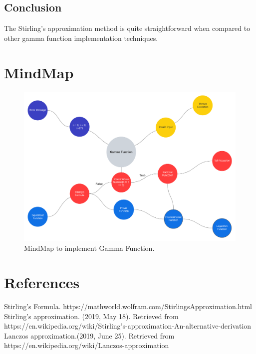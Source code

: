 \documentclass[a4paper, 11pt]{article}
\begin{document}
\subsection{Conclusion}
The Stirling's approximation method is quite straightforward when compared to other gamma function implementation techniques.

\newpage
\section{MindMap}

\begin{figure}[h]
    \centering
    \includegraphics[width=1.0\linewidth]{Images/Mind map.png}
    \caption{MindMap to implement Gamma Function.}
    \label{fig:Exp_Data}
\end{figure}

\section{References}
Stirling's Formula.
https://mathworld.wolfram.com/StirlingsApproximation.html\\

\noindent
Stirling's approximation. (2019, May 18). Retrieved from https://en.wikipedia.org/wiki/Stirling's-approximation-An-alternative-derivation \\

\noindent
Lanczos approximation.(2019, June 25). Retrieved from https://en.wikipedia.org/wiki/Lanczos-approximation
\end{document}
